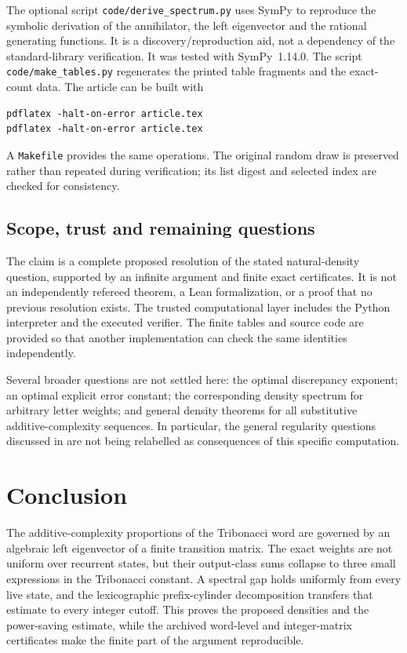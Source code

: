 \documentclass[11pt,a4paper]{article}
\theoremstyle{definition}
\theoremstyle{remark}
\newcommand{\code}[1]{\texttt{#1}}
\begin{document}
The optional script \code{code/derive\_spectrum.py} uses SymPy to reproduce
the symbolic derivation of the annihilator, the left eigenvector and the
rational generating functions. It is a discovery/reproduction aid, not a
dependency of the standard-library verification. It was tested with
SymPy~1.14.0. The script \code{code/make\_tables.py} regenerates the printed
table fragments and the exact-count data. The article can be built with
\begin{lstlisting}
pdflatex -halt-on-error article.tex
pdflatex -halt-on-error article.tex
\end{lstlisting}
A \code{Makefile} provides the same operations. The original random draw is
preserved rather than repeated during verification; its list digest and
selected index are checked for consistency.

\subsection{Scope, trust and remaining questions}
The claim is a complete proposed resolution of the stated natural-density
question, supported by an infinite argument and finite exact certificates.
It is not an independently refereed theorem, a Lean formalization, or a
proof that no previous resolution exists. The trusted computational layer
includes the Python interpreter and the executed verifier. The finite
tables and source code are provided so that another implementation can
check the same identities independently.

Several broader questions are not settled here: the optimal discrepancy
exponent; an optimal explicit error constant; the corresponding density
spectrum for arbitrary letter weights; and general density theorems for
all substitutive additive-complexity sequences. In particular, the general
regularity questions discussed in \cite{PSS,Couvreur} are not being
relabelled as consequences of this specific computation.

\section{Conclusion}
The additive-complexity proportions of the Tribonacci word are governed by
an algebraic left eigenvector of a finite transition matrix. The exact
weights are not uniform over recurrent states, but their output-class sums
collapse to three small expressions in the Tribonacci constant. A spectral
gap holds uniformly from every live state, and the lexicographic
prefix-cylinder decomposition transfers that estimate to every integer
cutoff. This proves the proposed densities and the power-saving estimate,
while the archived word-level and integer-matrix certificates make the
finite part of the argument reproducible.
\end{document}
